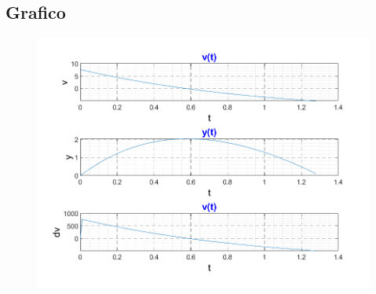 \subsection{Grafico}
\begin{figure}[h]
    \centering
    \includegraphics{cap/Elementary/img/script212}
    \label{fig:script212}
\end{figure}


